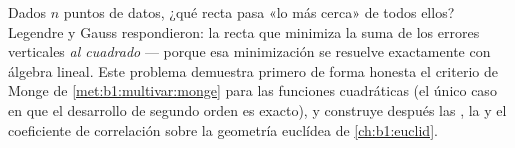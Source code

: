\begin{problem}\label{pb:b1:multivar:1}
Dados $n$ puntos de datos, ¿qué recta pasa «lo más cerca» de
todos ellos? Legendre y Gauss respondieron: la recta que minimiza la
suma de los errores verticales \emph{al cuadrado} --- porque esa
minimización se resuelve exactamente con álgebra lineal. Este problema
demuestra primero de forma honesta el criterio de Monge de
\cref{met:b1:multivar:monge} para las funciones cuadráticas (el único
caso en que el desarrollo de segundo orden es exacto), y construye
después las , la  y el coeficiente
de correlación sobre la geometría euclídea de
\cref{ch:b1:euclid}.


\end{problem}
